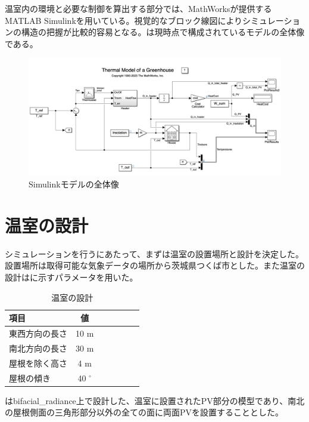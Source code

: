 \documentclass[uplatex,dvipdfmx,nomag,a4paper,oneside,onecolumn,12pt]{bxjsreport} %
\begin{document}
温室内の環境と必要な制御を算出する部分では、MathWorksが提供するMATLAB Simulinkを用いている\cite{MATLAB}。視覚的なブロック線図によりシミュレーションの構造の把握が比較的容易となる。は現時点で構成されているモデルの全体像である。

\begin{figure}[ht]
    \centering
    \includegraphics[width=0.9\linewidth]{fig/Simulink.png}
    \caption{Simulinkモデルの全体像}
    \label{fig:Simulink}
\end{figure}


\section{温室の設計}
シミュレーションを行うにあたって、まずは温室の設置場所と設計を決定した。設置場所は取得可能な気象データの場所から茨城県つくば市とした。また温室の設計はに示すパラメータを用いた。

\begin{table}[ht]
    \caption{温室の設計}
    \label{tab:housedesign}
    \centering
    \begin{tabular}{lcrrrrc}
        \toprule %
        項目 & 値\\
        \midrule %
        東西方向の長さ & 10 m\\
        南北方向の長さ & 30 m\\
        屋根を除く高さ & 4 m\\
        屋根の傾き & 40 \(^\circ\)\\
        \bottomrule %
    \end{tabular}
\end{table}


はbifacial\_radiance上で設計した、温室に設置されたPV部分の模型であり、南北の屋根側面の三角形部分以外の全ての面に両面PVを設置することとした。
\end{document}
